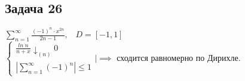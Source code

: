 \documentclass[a4paper, fleqn]{article}
\begin{document}
    \subsection*{Задача 26}
    $\sum\limits_{n = 1}^{\infty} \frac{(-1)^n \cdot x^{2n}}{2n - 1}, \; \; \; D = [-1, 1]$ \\
    $\begin{cases} \frac{ln\; n}{n + x} \downarrow_{(n)} 0 \\ \left|\sum\limits_{n = 1}^{\infty} (-1)^n\right| \leq 1 \end{cases} \bigg| \implies $ сходится равномерно по Дирихле. \\
    
    
    
\end{document}
